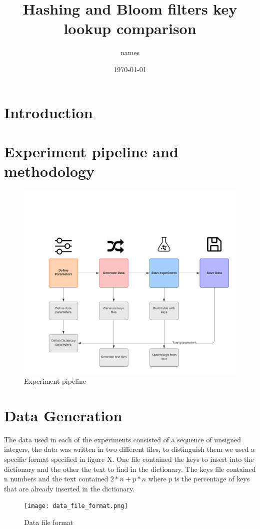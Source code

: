 \documentclass{article}
\title{Hashing and Bloom filters key lookup comparison}
\author{names}
\date{\today}
\begin{document}
    \maketitle
    \thispagestyle{empty}
    \begin{abstract}
        \lipsum[1]
    \end{abstract}


    \section{Introduction}
        \lipsum[2]

    \section{Experiment pipeline and methodology}
        \lipsum[1]
	\begin{figure}
	  \includegraphics[width=\linewidth]{experiment_pipeline.png}
	  \caption{Experiment pipeline}
	  \label{fig:Pipeline}
	\end{figure}
	\lipsum[1]
    \section{Data Generation}
        The data used in each of the experiments consisted of a sequence of unsigned integers,  the data was written in two different files, to distinguish them we used a specific format specified in figure X. One file contained the keys to insert into the dictionary and the other the text to find in the dictionary. The keys file contained n numbers and the text contained $2 * n + p * n$ where $p$ is the percentage of keys that are already inserted in the dictionary.
		\begin{center}		
		\begin{figure}[h]
	  		\texttt{[image: data\_file\_format.png]}
	  		\caption{Data file format}
	  		\label{fig:File format}
		\end{figure}
		\end{center}
\end{document}
